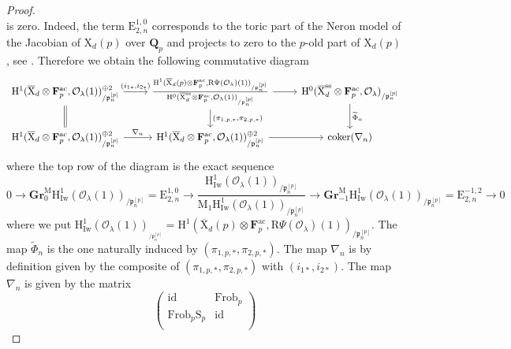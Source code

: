 \documentclass[10pt]{amsart}
\numberwithin{equation}{section}
\theoremstyle{plain}
\numberwithin{equation}{section}
\theoremstyle{definition}
\theoremstyle{remark}
\def\coker{\mathrm{coker}}
\def\Frob{\mathrm{Frob}}
\def\ac{\mathrm{ac}}
\def\ss{\mathrm{ss}}
\def\ac{\mathrm{ac}}
\def\calO{\mathcal{O}}
\def\frakp{\mathfrak{p}}
\def\FF{\mathbf{F}}
\def\QQ{\mathbf{Q}}
\def\rmH{\mathrm{H}}
\def\rmE{\mathrm{E}}
\def\rmM{\mathrm{M}}
\def\rmX{\mathrm{X}}
\def\rmXbar{\overline{\rmX}}
\def\rmR{\mathrm{R}}
\def\rmS{\mathrm{S}}
\newcommand{\Iw}{\mathrm{Iw}}
\newcommand{\Gr}{\mathbf{Gr}}
\begin{document}
\begin{proof}
\begin{equation*}
\end{equation*}
is zero. Indeed, the term $\rmE^{1,0}_{2,n}$ corresponds to the toric part of the Neron model of the Jacobian of $\rmX_{d}(p)$ over $\QQ_{p}$ and projects to zero to the $p$-old part of $\rmX_{d}(p)$, see \cite[Theorem 3.10]{Ri-100}. Therefore we obtain the following commutative diagram 
\begin{equation*}
\begin{tikzcd}
\rmH^{1}(\rmXbar_{d}\otimes{\FF^{\ac}_{p}}, \calO_{\lambda}(1))^{\oplus 2}_{/\frakp^{[p]}_{n}} \arrow[r, "({i_{1*}, i_{2*}})"] \arrow[d, Rightarrow, no head] & \frac{\rmH^{1}(\rmXbar_{d}(p)\otimes{\FF^{\ac}_{p}}, \rmR\Psi(\calO_{\lambda})(1))_{/\frakp^{[p]}_{n}}}{\rmH^{0}(\rmXbar^{\ss}_{d}\otimes{\FF^{\ac}_{p}}, \calO_{\lambda}(1))_{/\frakp^{[p]}_{n}}} \arrow[r] \arrow[d, "({\pi_{1,p,*}, \pi_{2,p,*}})"] & \rmH^{0}(\rmXbar^{\ss}_{d}\otimes{\FF^{\ac}_{p}}, \calO_{\lambda})_{/\frakp^{[p]}_{n}}  \arrow[d, "\widetilde{\Phi}_{n}"] \\
\rmH^{1}(\rmXbar_{d}\otimes{\FF^{\ac}_{p}},\calO_{\lambda}(1))^{\oplus 2}_{/\frakp^{[p]}_{n}} \arrow[r, "\nabla_{n}"]      & \rmH^{1}(\rmXbar_{d}\otimes{\FF^{\ac}_{p}}, \calO_{\lambda}(1))^{\oplus 2}_{/\frakp^{[p]}_{n}} \arrow[r]                & \coker(\nabla_{n})             
\end{tikzcd}
\end{equation*}
where the top row of the diagram is the exact sequence 
\begin{equation*}
0\rightarrow\Gr^{\rmM}_{0}\rmH^{1}_{\Iw}(\calO_{\lambda}(1))_{/\frakp^{[p]}_{n}}=\rmE^{1,0}_{2,n}\rightarrow \frac{\rmH^{1}_{\Iw}(\calO_{\lambda}(1))_{/\frakp^{[p]}_{n}}}{\rmM_{1}\rmH^{1}_{\Iw}(\calO_{\lambda}(1))_{/\frakp^{[p]}_{n}}}\rightarrow \Gr^{\rmM}_{-1}\rmH^{1}_{\Iw}(\calO_{\lambda}(1))_{/\frakp^{[p]}_{n}}=\rmE^{-1,2}_{2, n}\rightarrow 0
\end{equation*}
where  we put $\rmH^{1}_{\Iw}(\calO_{\lambda}(1))_{_{/\frakp^{[p]}_{n}}}=\rmH^{1}(\rmXbar_{d}(p)\otimes{\FF^{\ac}_{p}},\rmR\Psi(\calO_{\lambda})(1))_{/\frakp^{[p]}_{n}}$. The map $\widetilde{\Phi}_{n}$ is the one naturally induced by $({\pi_{1,p,*}, \pi_{2,p,*}})$. The map $\nabla_{n}$ is by definition given by the composite of $({\pi_{1,p,*}, \pi_{2,p,*}})$ with $({i_{1*}, i_{2*}})$. The map $\nabla_{n}$ is given by the matrix
\begin{equation*}
\begin{pmatrix}
\mathrm{id} &   \Frob_{p}\\
\Frob_{p}\rmS_{p} & \mathrm{id}\\ 

\end{pmatrix}
\end{equation*}
\end{proof}
\end{document}
